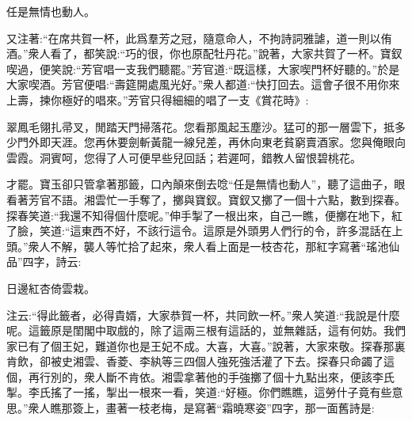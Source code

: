 \begin{poem}
    \begin{pl}任是無情也動人。\end{pl}
\end{poem}


\begin{parag}
    又注著:“在席共賀一杯，此爲羣芳之冠，隨意命人，不拘詩詞雅謔，道一則以侑酒。”衆人看了，都笑說:“巧的很，你也原配牡丹花。”說著，大家共賀了一杯。寶釵喫過，便笑說:“芳官唱一支我們聽罷。”芳官道:“既這樣，大家喫門杯好聽的。”於是大家喫酒。芳官便唱:“壽筵開處風光好。”衆人都道:“快打回去。這會子很不用你來上壽，揀你極好的唱來。”芳官只得細細的唱了一支《賞花時》:
\end{parag}


\begin{qute2sp}
    翠鳳毛翎扎帚叉，閒踏天門掃落花。您看那風起玉塵沙。猛可的那一層雲下，抵多少門外即天涯。您再休要劍斬黃龍一線兒差，再休向東老貧窮賣酒家。您與俺眼向雲霞。洞賓呵，您得了人可便早些兒回話；若遲呵，錯教人留恨碧桃花。
\end{qute2sp}


\begin{parag}
    才罷。寶玉卻只管拿著那籤，口內顛來倒去唸“任是無情也動人”，聽了這曲子，眼看著芳官不語。湘雲忙一手奪了，擲與寶釵。寶釵又擲了一個十六點，數到探春。探春笑道:“我還不知得個什麼呢。”伸手掣了一根出來，自己一瞧，便擲在地下，紅了臉，笑道:“這東西不好，不該行這令。這原是外頭男人們行的令，許多混話在上頭。”衆人不解，襲人等忙拾了起來，衆人看上面是一枝杏花，那紅字寫著“瑤池仙品”四字，詩云:
\end{parag}


\begin{poem}
    \begin{pl}日邊紅杏倚雲栽。\end{pl}

\end{poem}


\begin{parag}
    注云:“得此籤者，必得貴婿，大家恭賀一杯，共同飲一杯。”衆人笑道:“我說是什麼呢。這籤原是閨閣中取戲的，除了這兩三根有這話的，並無雜話，這有何妨。我們家已有了個王妃，難道你也是王妃不成。大喜，大喜。”說著，大家來敬。探春那裏肯飲，卻被史湘雲、香菱、李紈等三四個人強死強活灌了下去。探春只命蠲了這個，再行別的，衆人斷不肯依。湘雲拿著他的手強擲了個十九點出來，便該李氏掣。李氏搖了一搖，掣出一根來一看，笑道:“好極。你們瞧瞧，這勞什子竟有些意思。”衆人瞧那簽上，畫著一枝老梅，是寫著“霜曉寒姿”四字，那一面舊詩是:
\end{parag}


